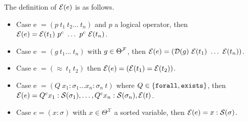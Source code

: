 \begin{definition}
The definition of $\E{e}$ is as follows.
\begin{itemize}
\setlength{\parskip}{0pt}
\item Case e $= (p~t_1~t_2\dots~t_n)$ and $p$ a logical operator, then $\E{e} = \E{t_1}~p^c~\dots~p^c~\E{t_n}$.
\item Case e $= (g~t_1\dots~t_n)$ with $g \in \Theta^\cal{F}$, then $\E{e} = (\mathcal{D}(g)~\E{t_1}~\dots~\E{t_n})$.
\item Case e $= (\approx~t_1~t_2)$ then $\E{e} = (\E{t_1} = \E{t_2})$.
\item Case e $= (Q~x_1 : \sigma_1  \dots x_n : \sigma_n ~t)$ where $Q\in \{\kw{forall}, \kw{exists}\}$, then $\E{e} = Q^c x_1: \cal{S}(\sigma_1), \dots, Q^c x_n: \cal{S}(\sigma_n), \E{t}$. 
\item Case $e = (x: \sigma )$ with $x \in \Theta^\mathcal{X}$ a sorted variable, then $\E{e} = x: \cal{S}(\sigma)$.
\end{itemize}
\end{definition}